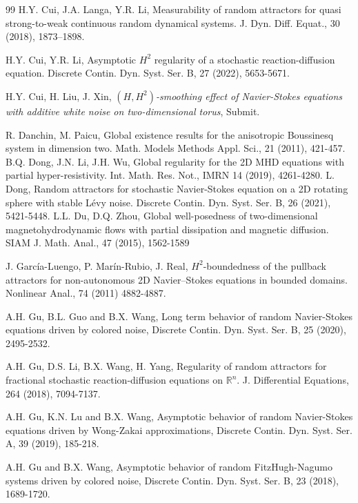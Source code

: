 \documentclass{elsarticle}
\theoremstyle{definition}
\numberwithin{equation}{section}
\begin{document}
\begin{thebibliography}{99}
 H.Y. Cui, J.A. Langa, Y.R. Li,   Measurability of random attractors for quasi strong-to-weak continuous random dynamical systems. J. Dyn. Diff. Equat.,  30 (2018), 1873–1898.


  H.Y. Cui, Y.R. Li,   Asymptotic $H^2$ regularity of a stochastic reaction-diffusion equation.  Discrete Contin. Dyn. Syst. Ser. B, 27 (2022), 5653-5671.

H.Y. Cui, H. Liu, J. Xin,  {\em $(H,H^2)$-smoothing effect  of   Navier-Stokes equations with additive white noise on two-dimensional torus}, Submit.

R. Danchin, M. Paicu,  Global existence results for the anisotropic Boussinesq system in dimension two. Math. Models Methods Appl. Sci., 21 (2011),  421-457.
 B.Q. Dong, J.N. Li, J.H. Wu,  Global regularity for the 2D MHD equations with partial hyper-resistivity. Int. Math. Res. Not., IMRN 14 (2019), 4261-4280.
 L. Dong,   Random attractors for stochastic Navier-Stokes equation on a 2D rotating sphere with stable L\'{e}vy noise. Discrete Contin. Dyn. Syst. Ser. B, 26 (2021), 5421-5448.
L.L. Du, D.Q. Zhou,  Global well-posedness of two-dimensional magnetohydrodynamic flows with partial dissipation and magnetic diffusion. SIAM J. Math. Anal., 47 (2015), 1562-1589






  J. García-Luengo, P. Marín-Rubio, J. Real,  $H^2$-boundedness of the pullback attractors for non-autonomous 2D Navier–Stokes equations in bounded domains. Nonlinear Anal., 74 (2011) 4882-4887.

 A.H. Gu, B.L. Guo and B.X. Wang, Long term  behavior of  random Navier-Stokes  equations driven by colored noise,  Discrete Contin. Dyn. Syst. Ser. B, 25 (2020), 2495-2532.

A.H. Gu, D.S. Li, B.X. Wang, H. Yang, Regularity of random attractors for fractional stochastic reaction-diffusion equations on $\mathbb{R}^n$. J. Differential Equations, 264 (2018), 7094-7137.

 A.H. Gu, K.N. Lu and B.X. Wang, Asymptotic behavior of random Navier-Stokes equations
driven by Wong-Zakai approximations, Discrete Contin. Dyn. Syst. Ser. A, 39 (2019), 185-218.

 A.H. Gu and B.X. Wang, Asymptotic behavior of random FitzHugh-Nagumo systems driven by colored noise, Discrete Contin. Dyn. Syst. Ser. B, 23 (2018), 1689-1720.









\end{thebibliography}
\end{document}
